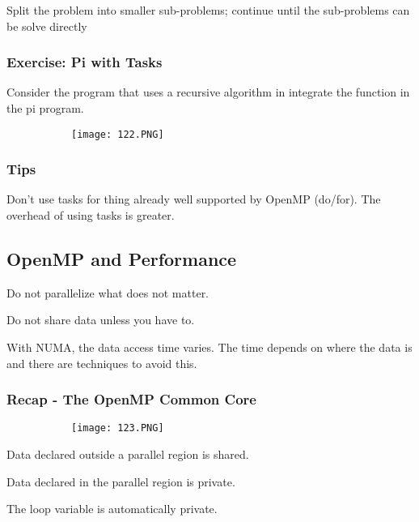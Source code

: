 \documentclass{article}
\begin{document}
Split the problem into smaller sub-problems; continue until the sub-problems can be solve directly

\subsubsection{Exercise: Pi with Tasks}

Consider the program that uses a recursive algorithm in integrate the function in the pi program.

\begin{figure}[ht!]
  \centering
  \begin{subfigure}[b]{0.5\linewidth}
    \texttt{[image: 122.PNG]}
  \end{subfigure}
\end{figure}

\subsubsection{Tips}
Don't use tasks for thing already well supported by OpenMP (do/for). The overhead of using tasks is greater.

\subsection{OpenMP and Performance}

Do not parallelize what does not matter. 

Do not share data unless you have to.

With NUMA, the data access time varies. The time depends on where the data is and there are techniques to avoid this.

\subsubsection{Recap - The OpenMP Common Core}

\begin{figure}[ht!]
  \centering
  \begin{subfigure}[b]{0.7\linewidth}
    \texttt{[image: 123.PNG]}
  \end{subfigure}
\end{figure}

Data declared outside a parallel region is shared.

Data declared in the parallel region is private.

The loop variable is automatically private.
\end{document}
